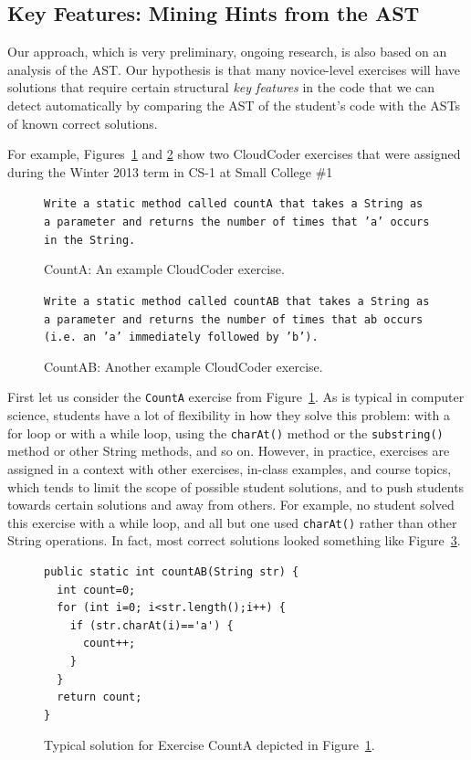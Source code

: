 \documentclass{sig-alternate}
\begin{document}
\subsection{Key Features:  Mining Hints from the AST}

Our approach, which is very preliminary, ongoing research,  is also based on an analysis of
the AST.
Our hypothesis is that many novice-level exercises
will have solutions that require certain structural
{\em key features} in the code that we can detect automatically by
comparing the AST of the student's code with the ASTs of known correct
solutions.

For example, Figures~\ref{fig:counta} and \ref{fig:countab} show two
CloudCoder exercises that were assigned during the Winter 2013 term in
CS-1 at 
Small College \#1

\begin{figure}[h]
{\tt Write a static method called countA that takes a String as a
parameter and returns the number of times that 'a' occurs in the String. }
\caption{CountA:  An example CloudCoder exercise.}
\label{fig:counta}
\end{figure}


\begin{figure}[h]
{\tt Write a static method called countAB that takes a String as a
parameter and returns the number of times that ab occurs (i.e. an 'a'
immediately followed by 'b'). }
\caption{CountAB: Another example CloudCoder exercise.}
\label{fig:countab}
\end{figure}

First let us consider the {\tt CountA} exercise from
Figure~\ref{fig:counta}.  As is typical in computer science, students have a lot of flexibility
in how they solve this problem:  with a for loop or with a while loop, using the {\tt charAt()}
method or the {\tt substring()} method or other String methods, and so on.  However, in
practice, exercises are assigned in a context with other
exercises, in-class examples, and course topics, which tends to limit
the scope of possible student solutions, and to push students towards
certain solutions and away from others.  For example, no student solved this
exercise with a while loop, and all but one used {\tt charAt()}
rather than other String operations.  In fact, most correct
solutions looked something like Figure~\ref{fig:counta-solution}.

\begin{figure}[h]
\begin{lstlisting}
public static int countAB(String str) {
  int count=0;
  for (int i=0; i<str.length();i++) {
    if (str.charAt(i)=='a') {
      count++;
    }
  }
  return count;
}
\end{lstlisting}
\caption{Typical solution for Exercise CountA depicted in Figure~\ref{fig:counta}.}
\label{fig:counta-solution}
\end{figure}
\end{document}

